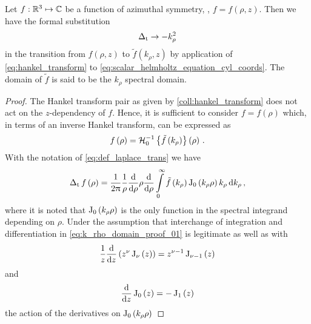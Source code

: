 \begin{corollary}\label{coll:k_rho_domain}
	Let $f: \mathbb{R}^3 \mapsto \mathbb{C}$ be a function of azimuthal symmetry, \ie,
	$f = f \left(\rho, z\right)$.
	Then we have the formal substitution 
	\begin{equation}\label{eq:k_rho_domain_laplaceTrans_replacement}
		\operatorname{\operatorname{\Delta}_\mathrm{t}} \to -k_\rho^2
	\end{equation}
	in the transition from $f \left(\rho, z\right)$ to
	$\tilde{f} \left(k_\rho, z\right)$ by application of
	\eqref{eq:hankel_transform} to
	\eqref{eq:scalar_helmholtz_equation_cyl_coords}.
	The domain of $\tilde{f}$ is said to be the $k_\rho$ spectral domain.
\end{corollary}
\begin{proof}
	The Hankel transform pair as given by \cref{coll:hankel_transform} does not
	act on the $z$-dependency of $f$.
	Hence, it is sufficient to consider
	$f = f \left(\rho\right)$ which, in terms of an inverse Hankel
	transform, can be expressed as
	\begin{equation}
		f \left(\rho\right) =
		\mathcal{H}^{-1}_{0} \left\{\tilde{f} \left(k_\rho\right)\right\} 
		\left(\rho\right)
		\, .
	\end{equation}
	With the notation of \eqref{eq:def_laplace_trans} we have
	\begin{equation}\label{eq:k_rho_domain_proof_01}
		\operatorname{\operatorname{\Delta}_\mathrm{t}}
		f \left(\rho\right) =
		\frac{1}{2\uppi}
		\frac{1}{\rho}
		\frac{\mathrm{d}}{\mathrm{d} \rho}
		\rho
		\frac{\mathrm{d}}{\mathrm{d} \rho}
		\int\limits_{0}^{\infty} 
		\tilde{f} \left(k_\rho\right)
		\operatorname{J}_{0}\left(k_\rho \rho\right)
		k_\rho
		\,
		\mathrm{d} k_\rho
		\, ,
	\end{equation}
	where it is noted that $\operatorname{J}_{0}\left(k_\rho \rho\right)$ is the only
	function in the spectral integrand depending on $\rho$.
	Under the assumption that interchange of integration and differentiation in 
	\eqref{eq:k_rho_domain_proof_01} is legitimate as well as with
	\cite[(10.6.6)]{Olver2010}
	\begin{equation}
		\frac{1}{z}
		\frac{\mathrm{d}}{\mathrm{d} z}
		\left( z^\nu \operatorname{J}_{\nu} \left(z\right) \right) =
		z^{\nu - 1} \operatorname{J}_{\nu - 1} \left(z\right)
	\end{equation}
	and \cite[(10.4.1)]{Olver2010}
	\begin{equation}
		\frac{\mathrm{d}}{\mathrm{d} z} \operatorname{J}_{0} \left(z\right) = 
		-\operatorname{J}_{1} \left(z\right)
	\end{equation}
	the action of the derivatives on $\operatorname{J}_{0}\left(k_\rho \rho\right)$ 

\end{proof}
